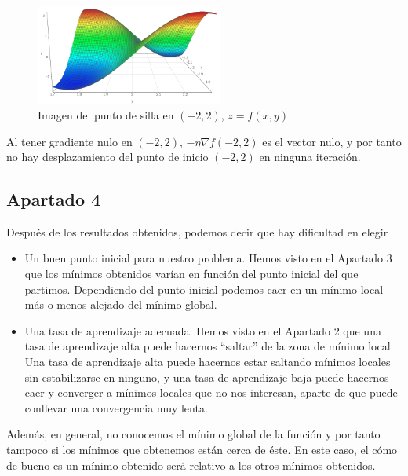 \documentclass[11pt,a4paper]{article}
\theoremstyle{definition}
\begin{document}
\begin{itemize}
	\begin{figure}[H]
	\centering
	\includegraphics[width=0.55\textwidth]{images/punto_silla2}
	\caption{Imagen del punto de silla en $(-2,2)$, $z=f(x,y)$}
	\end{figure}	
	
	Al tener gradiente nulo en $(-2,2)$, $-\eta \nabla f(-2,2)$ es el vector nulo, y por tanto no hay desplazamiento del punto de inicio $(-2,2)$ en ninguna iteración.
	
	\end{itemize}	
	
	\subsection{Apartado 4}
	Después de los resultados obtenidos, podemos decir que hay dificultad en elegir 
	\begin{itemize} 
	\item Un buen punto inicial para nuestro problema. Hemos visto en el Apartado 3 que los mínimos obtenidos varían en función del punto inicial del que partimos. Dependiendo del punto inicial podemos caer en un mínimo local más o menos alejado del mínimo global.
	\item Una tasa de aprendizaje adecuada. Hemos visto en el Apartado 2 que una tasa de aprendizaje alta puede hacernos ``saltar'' de la zona de mínimo local. Una tasa de aprendizaje alta puede hacernos estar saltando mínimos locales sin estabilizarse en ninguno, y una tasa de aprendizaje baja puede hacernos caer y converger a mínimos locales que no nos interesan, aparte de que puede conllevar una convergencia muy lenta.
	\end{itemize}
	
	Además, en general, no conocemos el mínimo global de la función y por tanto tampoco si los mínimos que obtenemos están cerca de éste. En este caso, el cómo de bueno es un mínimo obtenido será relativo a los otros mínimos obtenidos.
	
    \newpage
\end{document}

